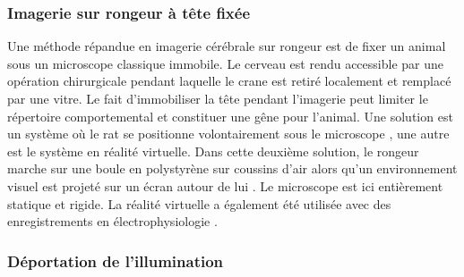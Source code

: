 
\subsubsection{Imagerie sur rongeur à tête fixée}

Une méthode répandue en imagerie cérébrale sur rongeur est de fixer un animal sous un microscope classique immobile. Le cerveau est rendu accessible par une opération chirurgicale pendant laquelle le crane est retiré localement et remplacé par une vitre. Le fait d'immobiliser la tête pendant l'imagerie peut limiter le répertoire comportemental et constituer une gêne pour l'animal. Une solution est un système où le rat se positionne volontairement sous le microscope \cite{scott_cellular_2013}, une autre est le système en réalité virtuelle. Dans cette deuxième solution, le rongeur marche sur une boule en polystyrène sur coussins d'air alors qu'un environnement visuel est projeté sur un écran autour de lui \cite{dombeck_functional_2010}. Le microscope est ici entièrement statique et rigide. La réalité virtuelle a également été utilisée avec des enregistrements en électrophysiologie \cite{aronov_engagement_2014}\cite{whitlock_navigating_2014}.




\subsubsection{Déportation de l'illumination}

